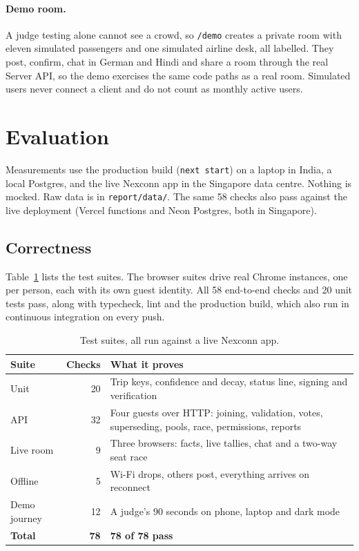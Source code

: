 \documentclass[10pt,twocolumn]{article}
\newcommand{\code}[1]{\texttt{\small #1}}
\begin{document}
\paragraph{Demo room.} A judge testing alone cannot see a crowd, so \code{/demo} creates a private room with eleven
simulated passengers and one simulated airline desk, all labelled. They post, confirm, chat in German and Hindi and
share a room through the real Server API, so the demo exercises the same code paths as a real room. Simulated users
never connect a client and do not count as monthly active users.

\section{Evaluation}\label{sec:eval}
Measurements use the production build (\code{next start}) on a laptop in India, a local Postgres, and the live
Nexconn app in the Singapore data centre. Nothing is mocked. Raw data is in \code{report/data/}. The same 58 checks also pass against the live deployment (Vercel functions and Neon Postgres, both in Singapore).

\subsection{Correctness}
Table~\ref{tab:suites} lists the test suites. The browser suites drive real Chrome instances, one per person, each with
its own guest identity. All 58 end-to-end checks and 20 unit tests pass, along with typecheck, lint and the
production build, which also run in continuous integration on every push.

\begin{table}[t]
\centering\small
\caption{Test suites, all run against a live Nexconn app.}
\label{tab:suites}
\begin{tabularx}{\columnwidth}{@{}l r X@{}}
\toprule
\textbf{Suite} & \textbf{Checks} & \textbf{What it proves} \\
\midrule
Unit & 20 & Trip keys, confidence and decay, status line, signing and verification \\
API & 32 & Four guests over HTTP: joining, validation, votes, superseding, pools, race, permissions, reports \\
Live room & 9 & Three browsers: facts, live tallies, chat and a two-way seat race \\
Offline & 5 & Wi-Fi drops, others post, everything arrives on reconnect \\
Demo journey & 12 & A judge's 90 seconds on phone, laptop and dark mode \\
\midrule
\textbf{Total} & \textbf{78} & \textbf{78 of 78 pass} \\
\bottomrule
\end{tabularx}
\end{table}
\end{document}
